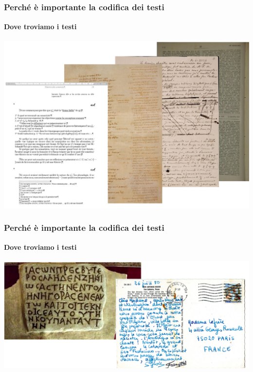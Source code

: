 \begin{frame}
    \frametitle{Perché è importante la codifica dei testi}
    \framesubtitle{Dove troviamo i testi}
    \addtocounter{nframe}{1}
    
    \begin{center}

        \includegraphics[width=.9\textwidth]{imgs/TestiVariSupporti.pdf}

    \end{center}

\end{frame}

\begin{frame}
    \frametitle{Perché è importante la codifica dei testi}
    \framesubtitle{Dove troviamo i testi}
    \addtocounter{nframe}{1}
    
    \begin{center}

        \includegraphics[width=.9\textwidth]{imgs/postCardStone.png}

    \end{center}

\end{frame}

